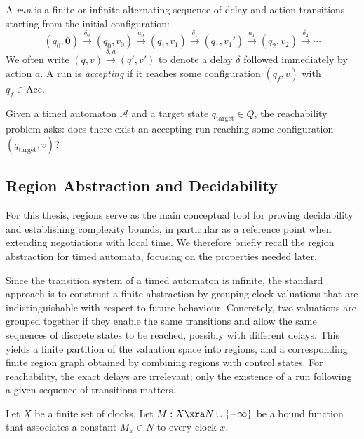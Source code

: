 A \emph{run} is a finite or infinite alternating sequence of delay and action transitions starting from the initial configuration:
\[
(q_0, \mathbf{0}) \xrightarrow{\delta_0} (q_0, v_0) \xrightarrow{a_0} (q_1, v_1) \xrightarrow{\delta_1} (q_1, v_1') \xrightarrow{a_1} (q_2, v_2) \xrightarrow{\delta_2} \cdots
\]
We often write $(q, v) \xrightarrow{\delta, a} (q', v')$ to denote a delay $\delta$ followed immediately by action $a$. A run is \emph{accepting} if it reaches some configuration $(q_f, v)$ with $q_f \in \text{Acc}$.

\begin{definition}
Given a timed automaton $\mathcal{A}$ and a target state $q_{\text{target}} \in Q$, the \textsf{reachability problem} asks: does there exist an accepting run reaching some configuration $(q_{\text{target}}, v)$?
\end{definition}


\subsection{Region Abstraction and Decidability~\cite{}}

For this thesis, regions serve as the main conceptual tool for proving decidability and establishing complexity bounds, in particular as a reference point when extending negotiations with local time. We therefore briefly recall the region abstraction for timed automata, focusing on the properties needed later.

Since the transition system of a timed automaton is infinite, the standard approach is to construct a finite abstraction by grouping clock valuations that are indistinguishable with respect to future behaviour. Concretely, two valuations are grouped together if they enable the same transitions and allow the same sequences of discrete states to be reached, possibly with different delays. This yields a finite partition of the valuation space into regions, and a corresponding finite region graph obtained by combining regions with control states. For reachability, the exact delays are irrelevant; only the existence of a run following a given sequence of transitions matters.

Let $X$ be a finite set of clocks. Let $M : X \xra N \cup \{-\infty\}$ be a bound function that associates a constant $M_x \in N$ to every clock $x$.

